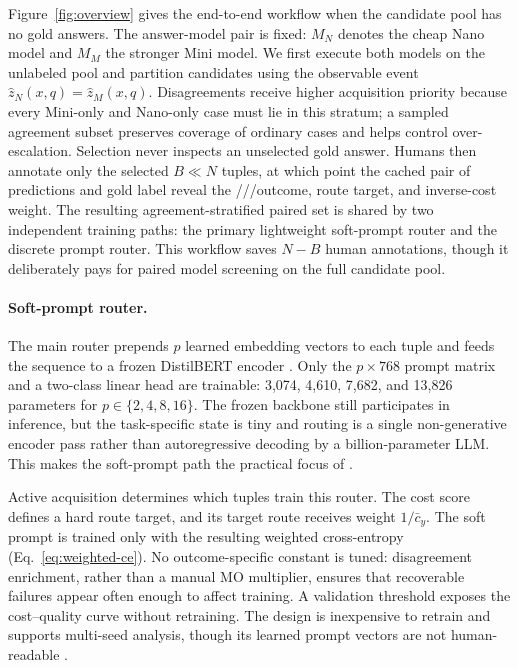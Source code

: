 Figure~\ref{fig:overview} gives the end-to-end workflow when the candidate pool
has no gold answers. The answer-model pair is fixed: $M_N$ denotes the cheap
Nano model and $M_M$ the stronger Mini model. We first execute both models on
the unlabeled pool and partition candidates using the observable event
$\hat z_N(x,q)=\hat z_M(x,q)$. Disagreements receive higher acquisition priority
because every Mini-only and Nano-only case must lie in this stratum; a sampled
agreement subset preserves coverage of ordinary cases and helps control
over-escalation. Selection never inspects an unselected gold answer. Humans then
annotate only the selected $B\ll N$ tuples, at which point the cached pair of
predictions and gold label reveal the \bc/\mo/\no/\bw outcome, route target, and
inverse-cost weight. The resulting agreement-stratified paired set is shared by
two independent training paths: the primary lightweight soft-prompt router and
the discrete prompt router. This workflow saves $N-B$ human annotations, though
it deliberately pays for paired model screening on the full candidate pool.

\paragraph{Soft-prompt router.}
The main \system router prepends $p$ learned embedding vectors to each tuple
and feeds the sequence to a frozen DistilBERT encoder
\cite{sanh2019distilbert}. Only the $p\times768$ prompt matrix and a two-class
linear head are trainable: 3,074, 4,610, 7,682, and 13,826 parameters for
$p\in\{2,4,8,16\}$. The frozen backbone still participates in inference, but
the task-specific state is tiny and routing is a single non-generative encoder
pass rather than autoregressive decoding by a billion-parameter LLM. This makes
the soft-prompt path the practical focus of \system.

Active acquisition determines which tuples train this router. The cost score
defines a hard route target, and its target route receives weight
$1/\bar c_y$. The soft prompt is trained only with the resulting weighted
cross-entropy (Eq.~\ref{eq:weighted-ce}). No outcome-specific constant is
tuned: disagreement enrichment, rather than a manual MO multiplier, ensures that
recoverable failures appear often enough to affect training. A
validation threshold exposes the cost--quality curve without retraining. The
design is inexpensive to retrain and supports multi-seed analysis, though its
learned prompt vectors are not human-readable
\cite{lester2021prompttuning}.
